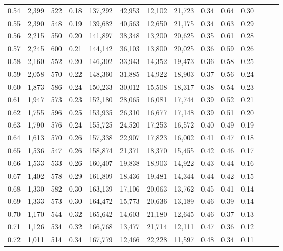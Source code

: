 \begin{tabular}{rrrrrrrrrrrrrr}
0.54 &  2,399 &    522 &  0.18 &  137,292 &   42,953 &  12,102 &  21,723 &  0.34 &  0.64 &      0.30 \\
0.55 &  2,390 &    548 &  0.19 &  139,682 &   40,563 &  12,650 &  21,175 &  0.34 &  0.63 &      0.29 \\
0.56 &  2,215 &    550 &  0.20 &  141,897 &   38,348 &  13,200 &  20,625 &  0.35 &  0.61 &      0.28 \\
0.57 &  2,245 &    600 &  0.21 &  144,142 &   36,103 &  13,800 &  20,025 &  0.36 &  0.59 &      0.26 \\
0.58 &  2,160 &    552 &  0.20 &  146,302 &   33,943 &  14,352 &  19,473 &  0.36 &  0.58 &      0.25 \\
0.59 &  2,058 &    570 &  0.22 &  148,360 &   31,885 &  14,922 &  18,903 &  0.37 &  0.56 &      0.24 \\
0.60 &  1,873 &    586 &  0.24 &  150,233 &   30,012 &  15,508 &  18,317 &  0.38 &  0.54 &      0.23 \\
0.61 &  1,947 &    573 &  0.23 &  152,180 &   28,065 &  16,081 &  17,744 &  0.39 &  0.52 &      0.21 \\
0.62 &  1,755 &    596 &  0.25 &  153,935 &   26,310 &  16,677 &  17,148 &  0.39 &  0.51 &      0.20 \\
0.63 &  1,790 &    576 &  0.24 &  155,725 &   24,520 &  17,253 &  16,572 &  0.40 &  0.49 &      0.19 \\
0.64 &  1,613 &    570 &  0.26 &  157,338 &   22,907 &  17,823 &  16,002 &  0.41 &  0.47 &      0.18 \\
0.65 &  1,536 &    547 &  0.26 &  158,874 &   21,371 &  18,370 &  15,455 &  0.42 &  0.46 &      0.17 \\
0.66 &  1,533 &    533 &  0.26 &  160,407 &   19,838 &  18,903 &  14,922 &  0.43 &  0.44 &      0.16 \\
0.67 &  1,402 &    578 &  0.29 &  161,809 &   18,436 &  19,481 &  14,344 &  0.44 &  0.42 &      0.15 \\
0.68 &  1,330 &    582 &  0.30 &  163,139 &   17,106 &  20,063 &  13,762 &  0.45 &  0.41 &      0.14 \\
0.69 &  1,333 &    573 &  0.30 &  164,472 &   15,773 &  20,636 &  13,189 &  0.46 &  0.39 &      0.14 \\
0.70 &  1,170 &    544 &  0.32 &  165,642 &   14,603 &  21,180 &  12,645 &  0.46 &  0.37 &      0.13 \\
0.71 &  1,126 &    534 &  0.32 &  166,768 &   13,477 &  21,714 &  12,111 &  0.47 &  0.36 &      0.12 \\
0.72 &  1,011 &    514 &  0.34 &  167,779 &   12,466 &  22,228 &  11,597 &  0.48 &  0.34 &      0.11 \\

\end{tabular}
